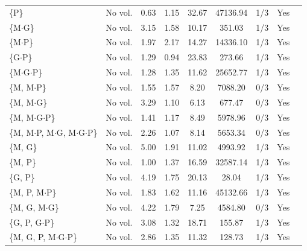 \begin{tabular}{@{}llccccccc@{}}
\{P\} & No vol. & 0.63 & 1.15 & 32.67 & 47136.94 & 1/3 & Yes \\
\{M$\cdot$G\} & No vol. & 3.15 & 1.58 & 10.17 & 351.03 & 1/3 & Yes \\
\{M$\cdot$P\} & No vol. & 1.97 & 2.17 & 14.27 & 14336.10 & 1/3 & Yes \\
\{G$\cdot$P\} & No vol. & 1.29 & 0.94 & 23.83 & 273.66 & 1/3 & Yes \\
\{M$\cdot$G$\cdot$P\} & No vol. & 1.28 & 1.35 & 11.62 & 25652.77 & 1/3 & Yes \\
\{M, M$\cdot$P\} & No vol. & 1.55 & 1.57 & 8.20 & 7088.20 & 0/3 & Yes \\
\{M, M$\cdot$G\} & No vol. & 3.29 & 1.10 & 6.13 & 677.47 & 0/3 & Yes \\
\{M, M$\cdot$G$\cdot$P\} & No vol. & 1.41 & 1.17 & 8.49 & 5978.96 & 0/3 & Yes \\
\{M, M$\cdot$P, M$\cdot$G, M$\cdot$G$\cdot$P\} & No vol. & 2.26 & 1.07 & 8.14 & 5653.34 & 0/3 & Yes \\
\{M, G\} & No vol. & 5.00 & 1.91 & 11.02 & 4993.92 & 1/3 & Yes \\
\{M, P\} & No vol. & 1.00 & 1.37 & 16.59 & 32587.14 & 1/3 & Yes \\
\{G, P\} & No vol. & 4.19 & 1.75 & 20.13 & 28.04 & 1/3 & Yes \\
\{M, P, M$\cdot$P\} & No vol. & 1.83 & 1.62 & 11.16 & 45132.66 & 1/3 & Yes \\
\{M, G, M$\cdot$G\} & No vol. & 4.22 & 1.79 & 7.25 & 4584.80 & 0/3 & Yes \\
\{G, P, G$\cdot$P\} & No vol. & 3.08 & 1.32 & 18.71 & 155.87 & 1/3 & Yes \\
\{M, G, P, M$\cdot$G$\cdot$P\} & No vol. & 2.86 & 1.35 & 11.32 & 128.73 & 1/3 & Yes \\
\bottomrule
\end{tabular}
